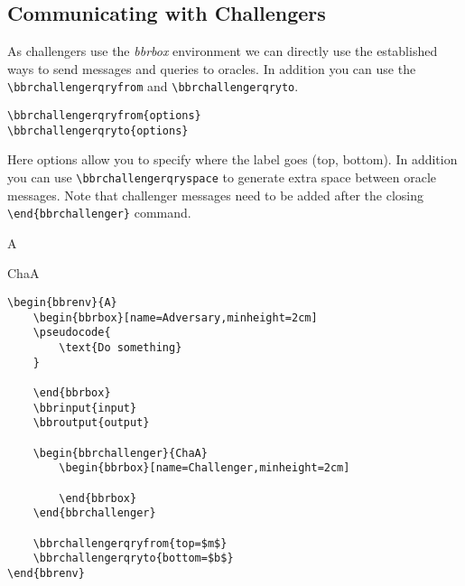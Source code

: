 \documentclass[a4paper]{report}
\begin{document}
\subsection{Communicating with Challengers}
As challengers use the \emph{bbrbox} environment we can directly use the established ways to send messages and
queries to oracles. In addition you can use the \lstinline$\bbrchallengerqryfrom$ and \lstinline$\bbrchallengerqryto$.
\begin{lstlisting}
\bbrchallengerqryfrom{options}
\bbrchallengerqryto{options}
\end{lstlisting}
Here options allow you to specify where the label goes (top, bottom). In addition you can use
\lstinline$\bbrchallengerqryspace$ to generate extra space between oracle messages. Note
that challenger messages need to be added after the closing \lstinline$\end{bbrchallenger}$ command.

\begin{bbrenv}{A}
	\begin{bbrbox}[name=Adversary,minheight=2cm]

	\end{bbrbox}

	\begin{bbrchallenger}{ChaA}
		\begin{bbrbox}[name=Challenger,minheight=2cm]
		
		\end{bbrbox}
	\end{bbrchallenger}

\end{bbrenv}

\begin{lstlisting}
\begin{bbrenv}{A}
	\begin{bbrbox}[name=Adversary,minheight=2cm]
	\pseudocode{
		\text{Do something} 
	}

	\end{bbrbox}
	\bbrinput{input}
	\bbroutput{output}

	\begin{bbrchallenger}{ChaA}
		\begin{bbrbox}[name=Challenger,minheight=2cm]
		
		\end{bbrbox}
	\end{bbrchallenger}

	\bbrchallengerqryfrom{top=$m$}
	\bbrchallengerqryto{bottom=$b$}
\end{bbrenv}
\end{lstlisting}
\end{document}
